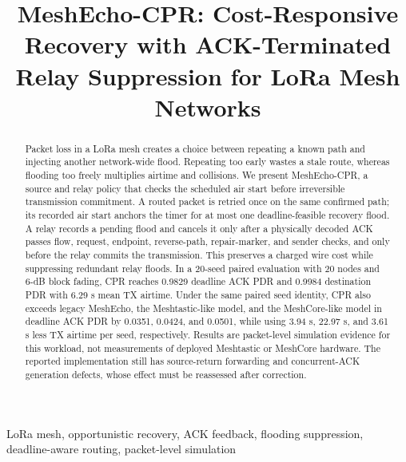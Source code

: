 \documentclass[conference,letterpaper,10pt]{IEEEtran}
\begin{document}
\title{MeshEcho-CPR: Cost-Responsive Recovery with ACK-Terminated Relay Suppression for LoRa Mesh Networks}

\author{
}

\maketitle

\begin{abstract}
Packet loss in a LoRa mesh creates a choice between repeating a known path and
injecting another network-wide flood. Repeating too early wastes a stale route,
whereas flooding too freely multiplies airtime and collisions. We present
MeshEcho-CPR, a source and relay policy that checks the scheduled air start
before irreversible transmission commitment. A routed packet is retried once
on the same confirmed path; its recorded air start anchors the timer for at
most one deadline-feasible recovery flood. A relay records a pending flood and
cancels it only after a
physically decoded ACK passes flow, request, endpoint, reverse-path,
repair-marker, and sender checks, and only before the relay commits the
transmission.
This preserves a charged wire cost while suppressing redundant relay floods.
In a 20-seed paired evaluation with 20 nodes and 6-dB block fading, CPR reaches
0.9829 deadline ACK PDR and 0.9984 destination PDR with 6.29 s mean TX
airtime. Under the same paired seed identity, CPR also exceeds legacy MeshEcho, the
Meshtastic-like model, and the MeshCore-like model in deadline ACK PDR by
0.0351, 0.0424, and 0.0501, while using 3.94 s, 22.97 s, and 3.61 s less TX
airtime per seed, respectively. Results
are packet-level simulation evidence for this workload, not measurements of
deployed Meshtastic or MeshCore hardware. The reported implementation still
has source-return forwarding and concurrent-ACK generation defects, whose
effect must be reassessed after correction.
\end{abstract}

\begin{IEEEkeywords}
LoRa mesh, opportunistic recovery, ACK feedback, flooding suppression,
deadline-aware routing, packet-level simulation
\end{IEEEkeywords}
\end{document}
